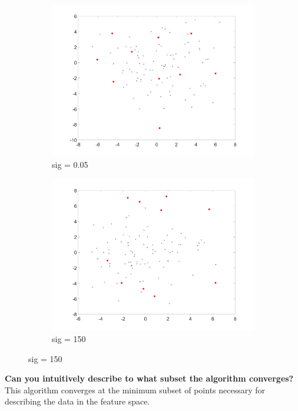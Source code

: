 \documentclass[11pt,oneside,a4paper]{article}
\begin{document}
\begin{figure}[H]
	\begin{subfigure}[b]{0.4\textwidth}
		\includegraphics[width=\textwidth]{../Figures/sig05aprox}
		\caption{sig = 0.05}
	\end{subfigure}
	\begin{subfigure}[b]{0.4\textwidth}
		\includegraphics[width=\textwidth]{../Figures/sig100aprox}
		\caption{sig = 150}
	\end{subfigure}
\end{figure}

\textbf{Can you intuitively describe to what subset the algorithm converges?}
This algorithm converges at the minimum subset of points necessary for describing the data in the feature space. 
\end{document}
